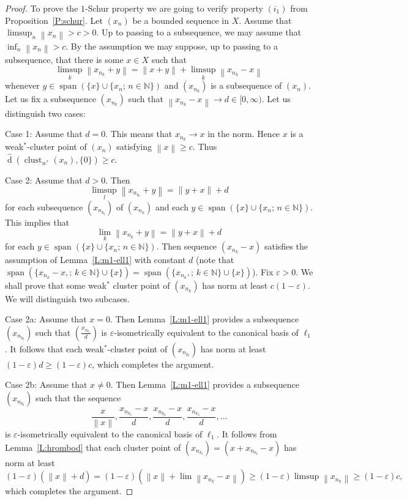 \documentclass{amsart}
\numberwithin{equation}{section}
\theoremstyle{definition}
\def\ep{\varepsilon}
\def\en{\mathbb N}
\def\span{\operatorname{span}}
\def\dh{\widehat{\operatorname{d}}}
\def\clu#1{\operatorname{clust}_{w^*}(#1)}
\newcommand{\norm}[1]{\left\|#1\right\|}
\newcommand{\setsep}{;\,}
\begin{document}
\begin{proof} To prove the $1$-Schur property we are going to verify property $(i_1)$ from Proposition~\ref{P:schur}.
    Let $(x_n)$ be a bounded sequence in $X$. Assume that $\limsup_n \norm{x_n}>c>0$. Up to passing to a subsequence, we may assume that $\inf_n \norm{x_n}>c$.
        By the assumption we may suppose, up to passing to a subsequence, that there is some $x\in X$
    such that
        $$\limsup_k\norm{x_{n_{k}}+y}=\norm{x+y}+\limsup_k\norm{x_{n_k}-x}$$
    whenever $y\in \span(\{x\}\cup\{x_{n}\setsep n\in\en\})$ and $(x_{n_k})$ is a subsequence of $(x_n)$. Let us fix a subsequence
    $(x_{n_k})$ such that $\norm{x_{n_k}-x}\to d\in[0,\infty)$. Let us distinguish two cases:

    Case 1: Assume that $d=0$. This means that $x_{n_k}\to x$ in the norm. Hence $x$ is a weak$^*$-cluster point of $(x_n)$ satisfying $\norm{x}\ge c$. Thus $\dh(\clu{x_n},\{0\})\ge c$.

   Case 2: Assume that $d>0$. Then
   $$\limsup_{l}\norm{x_{n_{k_l}}+y}=\norm{y+x}+d$$
   for each subsequence $(x_{n_{k_l}})$ of $(x_{n_k})$ and each $y\in  \span(\{x\}\cup\{x_{n}\setsep n\in\en\})$.
   This implies that
    $$\lim_{k}\norm{x_{n_k}+y}=\norm{y+x}+d$$
   for each $y\in  \span(\{x\}\cup\{x_{n}\setsep n\in\en\})$.
   Then sequence $(x_{n_k}-x)$ satisfies the assumption of Lemma~\ref{L:m1-ell1} with constant $d$ (note that
   $\span(\{x_{n_k}-x,\setsep k\in\en\}\cup\{x\})=\span(\{x_{n_k},\setsep k\in\en\}\cup\{x\})$). Fix $\ep>0$. We shall prove that some weak$^*$ cluster point of $(x_{n_k})$ has norm at least $c(1-\ep)$. We will distinguish two subcases.

    Case 2a: Assume that $x=0$. Then Lemma~\ref{L:m1-ell1} provides a subsequence $(x_{n_{k_l}})$ such that $(\frac{x_{n_{k_l}}}d)$ is $\ep$-isometrically equivalent to the canonical basis of $\ell_1$. It follows that each weak$^*$-cluster point of $(x_{n_{k_l}})$ has norm at least $(1-\ep)d\ge(1-\ep)c$, which completes the argument. 

    Case 2b: Assume that  $x\ne0$.  Then Lemma~\ref{L:m1-ell1} provides a subsequence $(x_{n_{k_l}})$ such that the sequence
    $$\frac{x}{\norm{x}},\frac{x_{n_{k_1}}-x}d,\frac{x_{n_{k_2}}-x}d,\frac{x_{n_{k_3}}-x}d,\dots$$ is $\ep$-isometrically equivalent to the canonical basis of $\ell_1$. It follows from Lemma~\ref{L:hrombod} that each cluster point of $(x_{n_{k_l}})=(x+x_{n_{k_l}}-x)$ has norm at least
    $$(1-\ep)(\norm{x}+d)=(1-\ep)(\norm{x}+\lim\norm{x_{n_{k}}-x})\ge(1-\ep)\limsup \norm{x_{n_{k}}}\ge(1-\ep)c,$$
    which completes the argument.


\end{proof}
\end{document}
